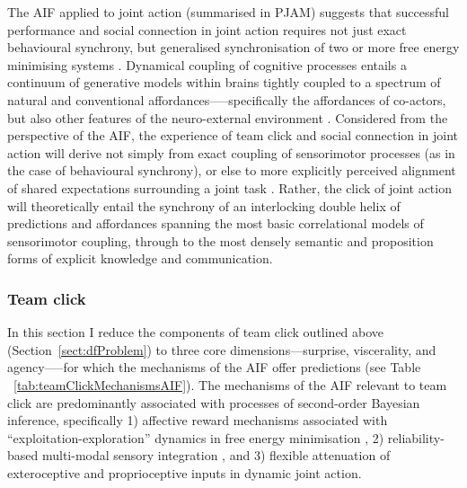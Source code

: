 \begin{CJK}{UTF8}{gbsn}
The AIF applied to joint action (summarised in PJAM) suggests that successful performance and social connection in joint action requires not just exact behavioural synchrony, but generalised synchronisation of two or more free energy minimising systems \citep{Friston2015}.  Dynamical coupling of cognitive processes entails a continuum of generative models within brains tightly coupled to a spectrum of natural and conventional affordances—--specifically the affordances of co-actors, but also other features of the neuro-external environment \citep{Clark2015}.  Considered from the perspective of the AIF, the experience of team click and social connection in joint action will derive not simply from exact coupling of sensorimotor processes (as in the case of behavioural synchrony), or else to more explicitly perceived alignment of shared expectations surrounding a joint task \citep[see][]{VanderWel2012}. Rather, the click of joint action will theoretically entail the synchrony of an interlocking double helix of predictions and affordances spanning the most basic correlational models of sensorimotor coupling, through to the most densely semantic and proposition forms of explicit knowledge and communication.


\subsubsection{Team click\label{sect:AIFteamClickJA}}

In this section I reduce the components of team click outlined above (Section~\ref{sect:dfProblem}) to three core dimensions—surprise, viscerality, and agency—--for which the mechanisms of the AIF offer predictions (see Table ~\ref{tab:teamClickMechanismsAIF}).  The mechanisms of the AIF relevant to team click are predominantly associated with processes of second-order Bayesian inference, specifically 1) affective reward mechanisms associated with ``exploitation-exploration'' dynamics in free energy minimisation \citep{Friston2012,Schwartenbeck2013,FitzGerald2014,Chetverikov2016},  2) reliability-based multi-modal sensory integration \citep{Ernst2004}, and 3) flexible attenuation \citep{Frith2007,Friston2015} of exteroceptive and proprioceptive inputs in dynamic joint action.


\end{CJK}
